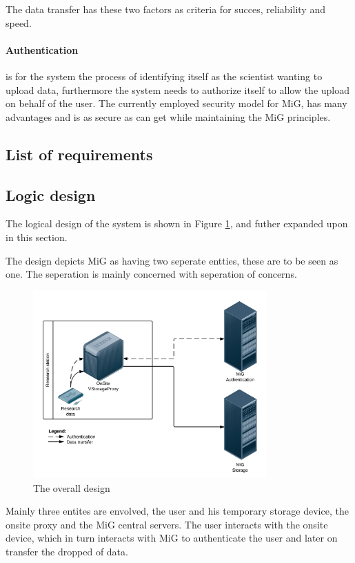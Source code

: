 The data transfer has these two factors as criteria for succes, reliability and
speed.

\paragraph{Authentication} is for the system the process of identifying itself
as the scientist wanting to upload data, furthermore the system needs to
authorize itself to allow the upload on behalf of the user. The currently
employed security model for MiG, has many advantages and is as secure as can
get while maintaining the MiG principles.

\subsection{List of requirements}

\subsection{Logic design}
The logical design of the system is shown in Figure \ref{fig:overall_design},
and futher expanded upon in this section.

The design depicts MiG as having two seperate entties, these are to be seen as
one. The seperation is mainly concerned with seperation of concerns.

\begin{figure}[h]
\centering
\includegraphics[width=0.8\textwidth]{diagram-design}
\caption{The overall design}
\label{fig:overall_design}
\end{figure}

Mainly three entites are envolved, the user and his temporary storage
device, the onsite proxy and the MiG central servers. The user interacts with
the onsite device, which in turn interacts with MiG to authenticate the user
and later on transfer the dropped of data.

